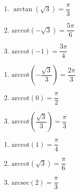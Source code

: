 \begin{multicols}{3} 

\begin{enumerate}

\setcounter{enumi}{\value{HW}}

\item $\arctan \left( \sqrt{3} \right) = \dfrac{\pi}{3}$ 
\item $\mbox{arccot} \left( -\sqrt{3} \right) = \dfrac{5\pi}{6}$
\item $\mbox{arccot} \left( -1 \right) = \dfrac{3\pi}{4}$

\setcounter{HW}{\value{enumi}}

\end{enumerate}

\end{multicols}

\begin{multicols}{3} 

\begin{enumerate}

\setcounter{enumi}{\value{HW}}

\item $\mbox{arccot} \left( -\dfrac{\sqrt{3}}{3} \right) = \dfrac{2\pi}{3}$
\item $\mbox{arccot} \left( 0 \right) = \dfrac{\pi}{2}$ 
\item $\mbox{arccot} \left( \dfrac{\sqrt{3}}{3} \right) = \dfrac{\pi}{3}$

\setcounter{HW}{\value{enumi}}

\end{enumerate}

\end{multicols}

\begin{multicols}{3} 

\begin{enumerate}

\setcounter{enumi}{\value{HW}}

\item $\mbox{arccot} \left( 1 \right) = \dfrac{\pi}{4}$
\item $\mbox{arccot} \left( \sqrt{3} \right) = \dfrac{\pi}{6}$
\item $\mbox{arcsec} \left( 2 \right) = \dfrac{\pi}{3}$

\setcounter{HW}{\value{enumi}}

\end{enumerate}

\end{multicols}

